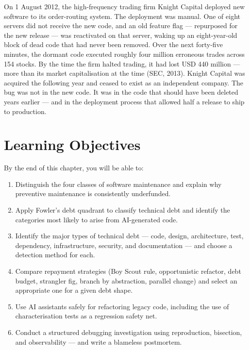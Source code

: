 \documentclass[11pt,a4paper]{book}
\begin{document}
\medskip

On 1 August 2012, the high-frequency trading firm Knight Capital deployed new software to its order-routing system. The deployment was manual. One of eight servers did not receive the new code, and an old feature flag --- repurposed for the new release --- was reactivated on that server, waking up an eight-year-old block of dead code that had never been removed. Over the next forty-five minutes, the dormant code executed roughly four million erroneous trades across 154 stocks. By the time the firm halted trading, it had lost USD 440 million --- more than its market capitalisation at the time (SEC, 2013). Knight Capital was acquired the following year and ceased to exist as an independent company. The bug was not in the new code. It was in the code that should have been deleted years earlier --- and in the deployment process that allowed half a release to ship to production.

\medskip

\section{Learning Objectives}

By the end of this chapter, you will be able to:

\begin{enumerate}
  \item Distinguish the four classes of software maintenance and explain why preventive maintenance is consistently underfunded.
  \item Apply Fowler's debt quadrant to classify technical debt and identify the categories most likely to arise from AI-generated code.
  \item Identify the major types of technical debt --- code, design, architecture, test, dependency, infrastructure, security, and documentation --- and choose a detection method for each.
  \item Compare repayment strategies (Boy Scout rule, opportunistic refactor, debt budget, strangler fig, branch by abstraction, parallel change) and select an appropriate one for a given debt shape.
  \item Use AI assistants safely for refactoring legacy code, including the use of characterisation tests as a regression safety net.
  \item Conduct a structured debugging investigation using reproduction, bisection, and observability --- and write a blameless postmortem.
\end{enumerate}
\end{document}
